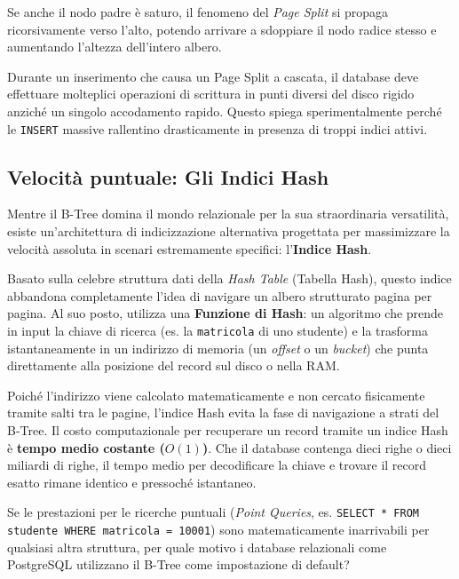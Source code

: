 \begin{warningbox}
Se anche il nodo padre è saturo, il fenomeno del \textit{Page Split} si propaga ricorsivamente verso l'alto, potendo arrivare a sdoppiare il nodo radice stesso e aumentando l'altezza dell'intero albero. 

Durante un inserimento che causa un Page Split a cascata, il database deve effettuare molteplici operazioni di scrittura in punti diversi del disco rigido anziché un singolo accodamento rapido. Questo spiega sperimentalmente perché le \texttt{INSERT} massive rallentino drasticamente in presenza di troppi indici attivi.
\end{warningbox}

\subsection{Velocità puntuale: Gli Indici Hash}

Mentre il B-Tree domina il mondo relazionale per la sua straordinaria versatilità, esiste un'architettura di indicizzazione alternativa progettata per massimizzare la velocità assoluta in scenari estremamente specifici: l'\textbf{Indice Hash}.

Basato sulla celebre struttura dati della \textit{Hash Table} (Tabella Hash), questo indice abbandona completamente l'idea di navigare un albero strutturato pagina per pagina. Al suo posto, utilizza una \textbf{Funzione di Hash}: un algoritmo che prende in input la chiave di ricerca (es. la \texttt{matricola} di uno studente) e la trasforma istantaneamente in un indirizzo di memoria (un \textit{offset} o un \textit{bucket}) che punta direttamente alla posizione del record sul disco o nella RAM.

Poiché l'indirizzo viene calcolato matematicamente e non cercato fisicamente tramite salti tra le pagine, l'indice Hash evita la fase di navigazione a strati del B-Tree. Il costo computazionale per recuperare un record tramite un indice Hash è \textbf{tempo medio costante ($O(1)$)}. Che il database contenga dieci righe o dieci miliardi di righe, il tempo medio per decodificare la chiave e trovare il record esatto rimane identico e pressoché istantaneo.


Se le prestazioni per le ricerche puntuali (\textit{Point Queries}, es. \texttt{SELECT * FROM studente WHERE matricola = 10001}) sono matematicamente inarrivabili per qualsiasi altra struttura, per quale motivo i database relazionali come PostgreSQL utilizzano il B-Tree come impostazione di default? 

